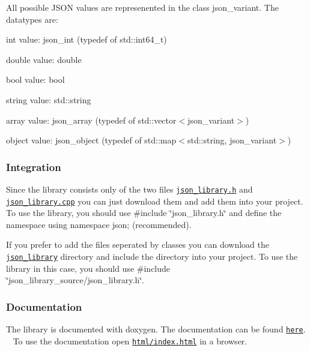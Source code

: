 All possible J\+S\+ON values are represenented in the class {\ttfamily json\+\_\+variant}. The datatypes are\+:
\begin{DoxyItemize}
\item int value\+: {\ttfamily json\+\_\+int} (typedef of {\ttfamily std\+::int64\+\_\+t})
\item double value\+: {\ttfamily double}
\item bool value\+: {\ttfamily bool}
\item string value\+: {\ttfamily std\+::string}
\item array value\+: {\ttfamily json\+\_\+array} (typedef of {\ttfamily std\+::vector$<$json\+\_\+variant$>$})
\item object value\+: {\ttfamily json\+\_\+object} (typedef of {\ttfamily std\+::map$<$std\+::string, json\+\_\+variant$>$})
\end{DoxyItemize}

\subsubsection*{\label{_integration_section}%
Integration}

Since the library consists only of the two files \href{https://github.com/n0dex/cppjsonlib/blob/master/json_library.h}{\tt json\+\_\+library.\+h} and \href{https://github.com/n0dex/cppjsonlib/blob/master/json_library.cpp}{\tt json\+\_\+library.\+cpp} you can just download them and add them into your project. To use the library, you should use {\ttfamily \#include \char`\"{}json\+\_\+library.\+h\char`\"{}} and define the namespace {\ttfamily using namespace json;} (recommended).

If you prefer to add the files seperated by classes you can download the \href{https://github.com/n0dex/cppjsonlib/tree/master/json_library_source}{\tt json\+\_\+library} directory and include the directory into your project. To use the library in this case, you should use {\ttfamily \#include \char`\"{}json\+\_\+library\+\_\+source/json\+\_\+library.\+h\char`\"{}}.

\subsubsection*{\label{_doc_section}%
Documentation}

The library is documented with doxygen. The documentation can be found \href{https://github.com/n0dex/cppjsonlib/tree/master/json_library_documentation}{\tt here}. ~\newline
To use the documentation open \href{https://github.com/n0dex/cppjsonlib/blob/master/json_library_documentation/html/index.html}{\tt html/index.\+html} in a browser.

